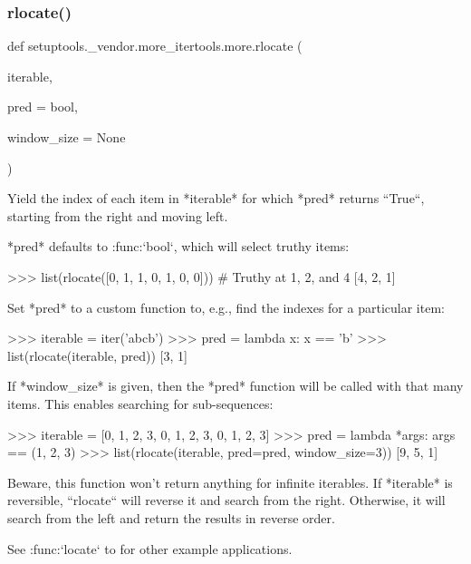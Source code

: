 \subsubsection{\texorpdfstring{rlocate()}{rlocate()}}
{\footnotesize\ttfamily def setuptools.\+\_\+vendor.\+more\+\_\+itertools.\+more.\+rlocate (\begin{DoxyParamCaption}\item[{}]{iterable,  }\item[{}]{pred = {\ttfamily bool},  }\item[{}]{window\+\_\+size = {\ttfamily None} }\end{DoxyParamCaption})}

\begin{DoxyVerb}Yield the index of each item in *iterable* for which *pred* returns
``True``, starting from the right and moving left.

*pred* defaults to :func:`bool`, which will select truthy items:

    >>> list(rlocate([0, 1, 1, 0, 1, 0, 0]))  # Truthy at 1, 2, and 4
    [4, 2, 1]

Set *pred* to a custom function to, e.g., find the indexes for a particular
item:

    >>> iterable = iter('abcb')
    >>> pred = lambda x: x == 'b'
    >>> list(rlocate(iterable, pred))
    [3, 1]

If *window_size* is given, then the *pred* function will be called with
that many items. This enables searching for sub-sequences:

    >>> iterable = [0, 1, 2, 3, 0, 1, 2, 3, 0, 1, 2, 3]
    >>> pred = lambda *args: args == (1, 2, 3)
    >>> list(rlocate(iterable, pred=pred, window_size=3))
    [9, 5, 1]

Beware, this function won't return anything for infinite iterables.
If *iterable* is reversible, ``rlocate`` will reverse it and search from
the right. Otherwise, it will search from the left and return the results
in reverse order.

See :func:`locate` to for other example applications.\end{DoxyVerb}
 \mbox{\label{namespacesetuptools_1_1__vendor_1_1more__itertools_1_1more_a075d2f23dd00cf2043eac197cc11039a}} 
